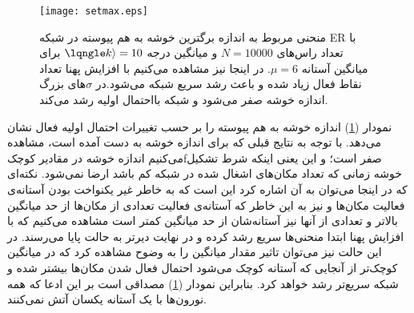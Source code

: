 \begin{figure}[htbp]
\hspace*{0cm}
\centering
\texttt{[image: setmax.eps]}
\caption [منحنی مربوط به اندازه برگترین خوشه به هم پیوسته در شبکه ER با آستانه گاوسی]{\footnotesize
 منحنی مربوط به اندازه برگترین خوشه به هم پیوسته در شبکه ER با تعداد راس‌های $N = 10000$ و میانگین درجه $\lqngle k \rangle = 10$ برای میانگین آستانه $\mu = 6$. در اینجا نیز مشاهده می‌کنیم با افزایش پهنا تعداد نقاط فعال زیاد شده و باعث رشد سریع شبکه می‌شود.در $\sigma$های بزرگ اندازه خوشه صفر می‌شود و شبکه بااحتمال   اولیه رشد می‌‌کند. }
\label{fig:ER1}
\end{figure}
نمودار (\ref{fig:ER1}) اندازه خوشه به هم پیوسته را بر حسب تغییرات احتمال اولیه فعال نشان می‌دهد. با توجه به نتایج قبلی که برای اندازه خوشه به دست آمده است، مشاهده می‌کنیم اندازه خوشه در مقادیر کوچکfصفر است؛ و این یعنی اینکه شرط تشکیل خوشه زمانی که تعداد مکان‌های اشغال شده در شبکه کم باشد ارضا نمی‌شود. نکته‌ای که در اینجا می‌توان به آن اشاره کرد این است که به خاطر غیر یکنواخت بودن آستانه‌ی فعالیت مکان‌ها و نیز به این خاطر که آستانه‌ی فعالیت تعدادی از مکان‌ها از حد میانگین بالاتر و تعدادی از آنها نیز آستانه‌شان از حد میانگین کمتر است مشاهده می‌کنیم که با افزایش پهنا ابتدا منحنی‌ها سریع رشد کرده و در نهایت دیرتر به حالت پایا می‌رسند. در این حالت نیز می‌توان تاثیر مقدار میانگین را به وضوح مشاهده کرد که در میانگین کوچک‌تر از آنجایی که آستانه کوچک می‌شود احتمال فعال شدن مکان‌ها بیشتر شده و شبکه سریع‌تر رشد خواهد کرد. بنابراین  نمودار (\ref{fig:ER1}) مصداقی است بر این ادعا که همه نورون‌ها با یک آستانه یکسان آتش نمی‌کنند.



